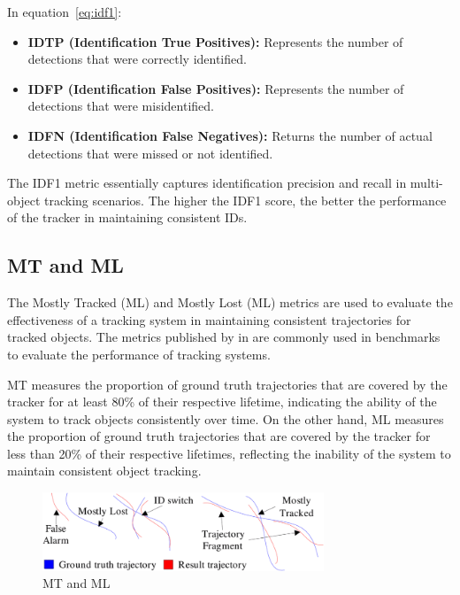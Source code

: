 In equation~\ref{eq:idf1}:

\begin{itemize}
    \item \textbf{IDTP (Identification True Positives):} Represents the number of detections that were correctly identified.
    \item \textbf{IDFP (Identification False Positives):} Represents the number of detections that were misidentified.
    \item \textbf{IDFN (Identification False Negatives):} Returns the number of actual detections that were missed or not identified.
\end{itemize}

The IDF1 metric essentially captures identification precision and recall in multi-object tracking scenarios. The higher the IDF1 score, the better the performance of the tracker in maintaining consistent IDs.

\subsection{MT and ML}\label{subsec:mt_ml}
The Mostly Tracked (ML) and Mostly Lost (ML) metrics are used to evaluate the effectiveness of a tracking system in maintaining consistent trajectories for tracked objects. The metrics published by \textcite{Wu06} in \citeyear{Wu06} are commonly used in benchmarks to evaluate the performance of tracking systems.

MT measures the proportion of ground truth trajectories that are covered by the tracker for at least 80\% of their respective lifetime, indicating the ability of the system to track objects consistently over time. On the other hand, ML measures the proportion of ground truth trajectories that are covered by the tracker for less than 20\% of their respective lifetimes, reflecting the inability of the system to maintain consistent object tracking.

\begin{figure}[ht]
    \centering
    \includegraphics[width=0.75\textwidth]{resources/fig/Wu06-MT_ML.png}
    \caption[MT and ML]{MT and ML~\cite[source image:][Fig.~5]{Wu06}}\label{fig:mt_ml}
\end{figure}

